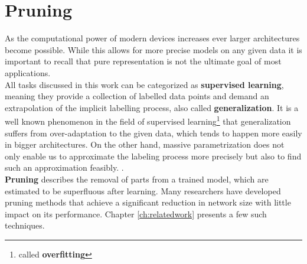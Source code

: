 \section{Pruning}
As the computational power of modern devices increases ever larger architectures become possible. While this allows for more precise models on any given data it is important to recall that pure representation is not the ultimate goal of most applications.\\
All tasks discussed in this work can be categorized as \textbf{supervised learning}, meaning they provide a collection of labelled data points and demand an extrapolation of the implicit labelling process, also called \textbf{generalization}.
It is a well known phenomenon in the field of supervised learning\footnote{called \textbf{overfitting}} that generalization suffers from over-adaptation to the given data, which tends to happen more easily in bigger architectures. On the other hand, massive parametrization does not only enable us to approximate the labeling process more precisely but also to find such an approximation feasibly. \cite{Overparametrization}.\\
\textbf{Pruning} describes the removal of parts from a trained model, which are estimated to be superfluous after learning. Many researchers have developed pruning methods that achieve a significant reduction in network size with little impact on its performance. Chapter \ref{ch:relatedwork} presents a few such techniques.

